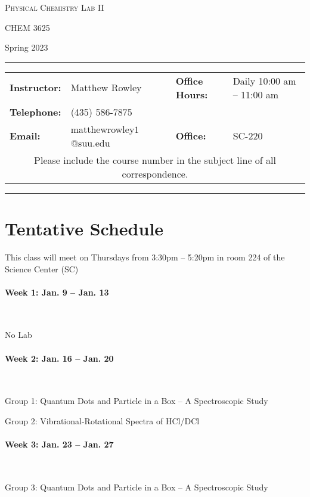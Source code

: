 \documentclass[12pt, letterpaper]{article}
\begin{document}
\begin{center}
	{\Large \textsc{Physical Chemistry Lab II}}

	CHEM 3625
\end{center}

\begin{center}
	{\large Spring 2023}
\end{center}
\begin{center}
	\rule{0.99\textwidth}{0.4pt}
	\begin{tabular}{llcll}
		\textbf{Instructor:} & Matthew Rowley           &  & \textbf{Office Hours:} & Daily 10:00 am -- 11:00 am \\
		\textbf{Telephone:}  & (435) 586-7875           &  &                        &                            \\
		\textbf{Email:}      & matthewrowley$1$@suu.edu &  & \textbf{Office:}       & SC-220                     \\
		\multicolumn{5}{c}{Please include the course number in the subject line of all correspondence.}
	\end{tabular}
	\rule{0.99\textwidth}{0.4pt}
\end{center}

\section*{Tentative Schedule}
This class will meet on Thursdays from 3:30pm -- 5:20pm in room 224 of the Science Center (SC)

\paragraph{Week 1: Jan. 9 -- Jan. 13}~

No Lab

\paragraph{Week 2: Jan. 16 -- Jan. 20}~

Group 1: Quantum Dots and Particle in a Box – A Spectroscopic Study

Group 2: Vibrational-Rotational Spectra of HCl/DCl
\paragraph{Week 3: Jan. 23 -- Jan. 27}~

Group 3: Quantum Dots and Particle in a Box – A Spectroscopic Study
\end{document}

